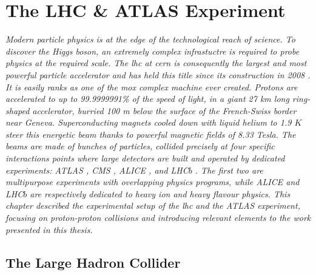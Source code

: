 \chapter{\color{oxfordblue} The LHC \& ATLAS Experiment}\label{chapter-ATLAS}
\ChapFrame

\textit{
Modern particle physics is at the edge of the technological reach of science. To discover the Higgs boson, an extremely complex infrastuctre is required to probe physics at the required scale. The \gls{lhc} at \gls{cern} is consequently the largest and most powerful particle accelerator and has held this title since its construction in 2008 \cite{LyndonEvans_2008}. It is easily ranks as one of the mox complex machine ever created. Protons are accelerated to up to 99.9999991\% of the speed of light, in a giant 27 km long ring-shaped accelerator, burried 100 m below the surface of the French-Swiss border near Geneva. Superconducting magnets cooled down with liquid helium to 1.9 $K$ steer this energetic beam thanks to powerful magnetic fields of 8.33 Tesla. The beams are made of bunches of particles, collided precisely at four specific interactions points where large detectors are built and operated by dedicated experiments: ATLAS \cite{TheATLASCollaboration_2008}, CMS \cite{TheCMSCollaboration_2008}, ALICE \cite{TheALICECollaboration_2008}, and LHC$b$ \cite{TheLHCbCollaboration_2008}. The first two are multipurpose experiments with overlapping physics programs, while ALICE and LHC$b$ are respectively dedicated to heavy ion and heavy flavour physics. This chapter described the experimental setup of the \gls{lhc} and the ATLAS experiment, focusing on proton-proton collisions and introducing relevant elements to the work presented in this thesis.} 

\section{The Large Hadron Collider}\label{sec-LHC} %

